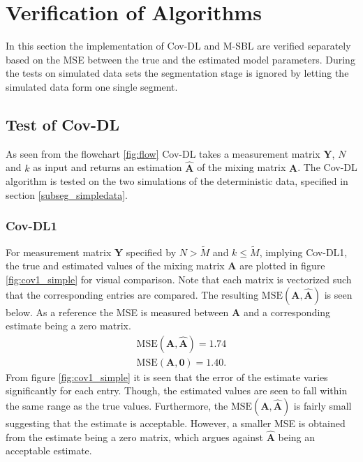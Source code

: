 \section{Verification of Algorithms}
In this section the implementation of Cov-DL and M-SBL are verified separately based on the MSE between the true and the estimated model parameters.
During the tests on simulated data sets the segmentation stage is ignored by letting the simulated data form one single segment.    

\subsection{Test of Cov-DL}
As seen from the flowchart \ref{fig:flow} Cov-DL takes a measurement matrix $\mathbf{Y}$, $N$ and $k$ as input and returns an estimation $\hat{\mathbf{A}}$ of the mixing matrix $\mathbf{A}$. 
The Cov-DL algorithm is tested on the two simulations of the deterministic data, specified in section \ref{subseg_simpledata}. 

\subsubsection{Cov-DL1}
For measurement matrix $\mathbf{Y}$ specified by $N > \widetilde{M}$ and $k \leq \widetilde{M}$, implying Cov-DL1, the true and estimated values of the mixing matrix $\mathbf{A}$ are plotted in figure \ref{fig:cov1_simple} for visual comparison. 
Note that each matrix is vectorized such that the corresponding entries are compared.  
The resulting $\text{MSE}(\mathbf{A}, \hat{\mathbf{A}})$ is seen below. 
As a reference the MSE is measured between $\mathbf{A}$ and a corresponding estimate being a zero matrix.   
\begin{align*}
\text{MSE}(\mathbf{A}, \hat{\mathbf{A}}) = 1.74 \\
\text{MSE}(\mathbf{A}, \mathbf{0}) = 1.40.
\end{align*}
From figure \ref{fig:cov1_simple} it is seen that the error of the estimate varies significantly for each entry. 
Though, the estimated values are seen to fall within the same range as the true values.
Furthermore, the $\text{MSE}(\mathbf{A}, \hat{\mathbf{A}})$ is fairly small suggesting that the estimate is acceptable. However, a smaller MSE is obtained from the estimate being a zero matrix, which argues against $\hat{\mathbf{A}}$ being an acceptable estimate. 

